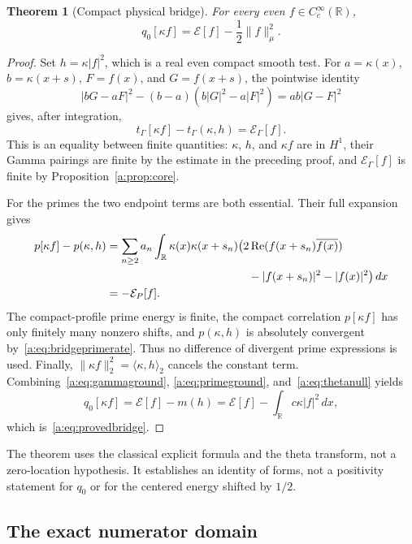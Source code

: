 \documentclass[11pt,a4paper]{article}
\numberwithin{equation}{section}
\newtheorem{theorem}{Theorem}[section]
\theoremstyle{definition}\newtheorem{definition}[theorem]{Definition}
\theoremstyle{remark}\newtheorem{remark}[theorem]{Remark}
\newcommand{\R}{\mathbb R}\newcommand{\C}{\mathbb C}\newcommand{\N}{\mathbb N}
\newcommand{\E}{\mathcal E}\newcommand{\D}{\mathcal D}
\newcommand{\tg}{t_\Gamma}\newcommand{\cg}{c_\Gamma}
\newcommand{\ip}[2]{\langle#1,#2\rangle}\newcommand{\norm}[1]{\lVert#1\rVert}\newcommand{\abs}[1]{\lvert#1\rvert}
\begin{document}
\begin{theorem}[Compact physical bridge]\label{a:thm:compactbridge}
For every even $f\in C_c^\infty(\R)$,
\begin{equation}\label{a:eq:provedbridge}
 q_0[\kappa f]=\E[f]-\frac12\norm{f}_\mu^2.
\end{equation}
\end{theorem}
\begin{proof}
Set $h=\kappa|f|^2$, which is a real even compact smooth test. For $a=\kappa(x)$, $b=\kappa(x+s)$, $F=f(x)$, and $G=f(x+s)$, the pointwise identity
\[
 |bG-aF|^2-(b-a)(b|G|^2-a|F|^2)=ab|G-F|^2
\]
gives, after integration,
\begin{equation}\label{a:eq:gammaground}
 \tg[\kappa f]-\tg(\kappa,h)=\E_\Gamma[f].
\end{equation}
This is an equality between finite quantities: $\kappa$, $h$, and $\kappa f$ are in $H^1$, their Gamma pairings are finite by the estimate in the preceding proof, and $\E_\Gamma[f]$ is finite by Proposition~\ref{a:prop:core}.

For the primes the two endpoint terms are both essential. Their full expansion gives
\begin{align}\label{a:eq:primeground}
 p[\kappa f]-p(\kappa,h)
 &=\sum_{n\ge2}a_n\int_\R\kappa(x)\kappa(x+s_n)
       \bigl(2\operatorname{Re}(f(x+s_n)\overline{f(x)})\notag\\
 &\hspace{44mm}-|f(x+s_n)|^2-|f(x)|^2\bigr)\,dx\notag\\
 &=-\E_P[f].
\end{align}
The compact-profile prime energy is finite, the compact correlation $p[\kappa f]$ has only finitely many nonzero shifts, and $p(\kappa,h)$ is absolutely convergent by~\eqref{a:eq:bridgeprimerate}. Thus no difference of divergent prime expressions is used. Finally,
$\norm{\kappa f}_2^2=\ip{\kappa}{h}_2$ cancels the constant term. Combining~\eqref{a:eq:gammaground}, \eqref{a:eq:primeground}, and~\eqref{a:eq:thetanull} yields
\[
 q_0[\kappa f]=\E[f]-m(h)
             =\E[f]-\int_\R c\kappa|f|^2\,dx,
\]
which is~\eqref{a:eq:provedbridge}.
\end{proof}

The theorem uses the classical explicit formula and the theta transform, not a zero-location hypothesis. It establishes an identity of forms, not a positivity statement for $q_0$ or for the centered energy shifted by $1/2$.

\subsection{The exact numerator domain}\label{a:sec:domain}
\end{document}
